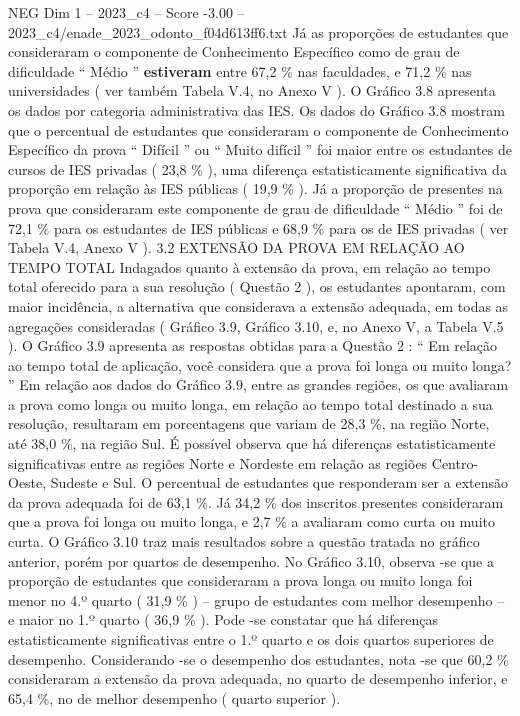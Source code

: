 \begin{textsample}{NEG Dim 1 – 2023\_c4 – Score -3.00 – 2023\_c4/enade\_2023\_odonto\_f04d613ff6.txt}
Já as proporções de estudantes que consideraram o componente de Conhecimento Específico como de grau de dificuldade “ Médio ” \textbf{estiveram} entre 67,2 \% nas faculdades, e 71,2 \% nas universidades ( ver também Tabela V.4, no Anexo V ).
O Gráfico 3.8 apresenta os dados por categoria administrativa das IES.
Os dados do Gráfico 3.8 mostram que o percentual de estudantes que consideraram o componente de Conhecimento Específico da prova “ Difícil ” ou “ Muito difícil ” foi maior entre os estudantes de cursos de IES privadas ( 23,8 \% ), uma diferença estatisticamente significativa da proporção em relação às IES públicas ( 19,9 \% ).
Já a proporção de presentes na prova que consideraram este componente de grau de dificuldade “ Médio ” foi de 72,1 \% para os estudantes de IES públicas e 68,9 \% para os de IES privadas ( ver Tabela V.4, Anexo V ). 3.2 EXTENSÃO DA PROVA EM RELAÇÃO AO TEMPO TOTAL Indagados quanto à extensão da prova, em relação ao tempo total oferecido para a sua resolução ( Questão 2 ), os estudantes apontaram, com maior incidência, a alternativa que considerava a extensão adequada, em todas as agregações consideradas ( Gráfico 3.9, Gráfico 3.10, e, no Anexo V, a Tabela V.5 ).
O Gráfico 3.9 apresenta as respostas obtidas para a Questão 2 : “ Em relação ao tempo total de aplicação, você considera que a prova foi longa ou muito longa? ” Em relação aos dados do Gráfico 3.9, entre as grandes regiões, os que avaliaram a prova como longa ou muito longa, em relação ao tempo total destinado a sua resolução, resultaram em porcentagens que variam de 28,3 \%, na região Norte, até 38,0 \%, na região Sul.
É possível observa que há diferenças estatisticamente significativas entre as regiões Norte e Nordeste em relação as regiões Centro-Oeste, Sudeste e Sul.
O percentual de estudantes que responderam ser a extensão da prova adequada foi de 63,1 \%.
Já 34,2 \% dos inscritos presentes consideraram que a prova foi longa ou muito longa, e 2,7 \% a avaliaram como curta ou muito curta.
O Gráfico 3.10 traz mais resultados sobre a questão tratada no gráfico anterior, porém por quartos de desempenho.
No Gráfico 3.10, observa -se que a proporção de estudantes que consideraram a prova longa ou muito longa foi menor no 4.º quarto ( 31,9 \% ) – grupo de estudantes com melhor desempenho – e maior no 1.º quarto ( 36,9 \% ).
Pode -se constatar que há diferenças estatisticamente significativas entre o 1.º quarto e os dois quartos superiores de desempenho.
Considerando -se o desempenho dos estudantes, nota -se que 60,2 \% consideraram a extensão da prova adequada, no quarto de desempenho inferior, e 65,4 \%, no de melhor desempenho ( quarto superior ).

\end{textsample}
